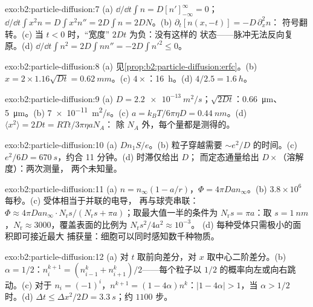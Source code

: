 \begin{solution}{exo:b2:particle-diffusion:7}
(a) $\dd/\dd t\int n = D[n']_{-\infty}^{\infty} = 0$；$\dd/\dd t\int x^2 n = D\int
x^2 n'' = 2D\int n = 2DN$。(b) $\partial_t[n(x,-t)] = -D\,\partial_x^2 n$：
符号翻转。(c) 当 $t < 0$ 时，“宽度” $2Dt$ 为负：没有这样的
状态——脉冲无法反向复原。(d) $\dd/\dd t\int n^2 = 2D\int nn''
= -2D\int n'^2 \le 0$。
\end{solution}

\begin{solution}{exo:b2:particle-diffusion:8}
(a) 见\cref{prop:b2:particle-diffusion:erfc}。(b) $x = 2 \times 1.16\sqrt{Dt}
= \qty{0.62}{mm}$。(c) $4\times$：\qty{16}{h}。(d) $4/2.5 = \qty{1.6}{h}$。
\end{solution}

\begin{solution}{exo:b2:particle-diffusion:9}
(a) $D = \qty{2.2e-13}{m^2/s}$；$\sqrt{2Dt}$：\qty{0.66}{\micro m}、
\qty{5}{\micro m}。(b) \qty{7e-11}{m^2/s}。(c) $a = k_BT/6\pi\eta D =
\qty{0.44}{nm}$。(d) $\langle x^2\rangle = 2Dt = RTt/3\pi\eta a N_A$：
除 $N_A$ 外，每个量都是测得的。
\end{solution}

\begin{solution}{exo:b2:particle-diffusion:10}
(a) $Dn_1S/e$。(b) 粒子穿越需要 $\sim e^2/D$ 的时间。(c)
$e^2/6D = \qty{670}{s}$，约合 11 分钟。(d) 时滞仅给出 $D$；
而定态通量给出 $D \times$（溶解度）：两次测量，
两个未知量。
\end{solution}

\begin{solution}{exo:b2:particle-diffusion:11}
(a) $n = n_\infty(1 - a/r)$，$\Phi = 4\pi D a n_\infty$。(b) $3.8 \times
10^6$ 每秒。(c) 受体相当于并联的电导，
再与球壳串联：$\Phi \approx 4\pi Dan_\infty
\cdot N_{\text{r}}s/(N_{\text{r}}s + \pi a)$；取最大值一半的条件为
$N_{\text{r}}s = \pi a$：取 $s = \qty{1}{nm}$，$N_{\text{r}} \approx
3000$，覆盖表面的比例为 $N_{\text{r}}s^2/4a^2 \approx 10^{-3}$。
(d) 每种受体只需极小的面积即可接近最大
捕获量：细胞可以同时感知数千种物质。
\end{solution}

\begin{solution}{exo:b2:particle-diffusion:12}
(a) 对 $t$ 取前向差分，对 $x$ 取中心二阶差分。(b)
$\alpha = 1/2$：$n_i^{k+1} = (n_{i-1}^k + n_{i+1}^k)/2$——每个粒子以
$1/2$ 的概率向左或向右跳动。(c) 对于 $n_i = (-1)^i$，$n^{k+1} =
(1 - 4\alpha)n^k$：$|1 - 4\alpha| > 1$，当 $\alpha > 1/2$ 时。(d) $\Delta t \le
\Delta x^2/2D = \qty{3.3}{s}$；约 $1100$ 步。
\end{solution}


